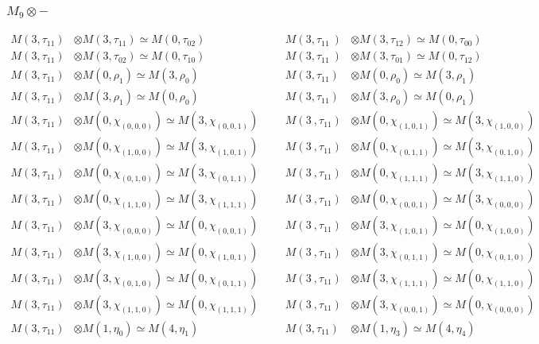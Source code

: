 \subsubsection{$M_9\otimes -$}
\begin{align*}
M(3,\tau_{11}) &\otimes M(3,\tau_{11}) \simeq M(0,\tau_{02}) &&& M(3,\tau_{11}\
) &\otimes M(3,\tau_{12}) \simeq M(0,\tau_{00})\\
M(3,\tau_{11}) &\otimes M(3,\tau_{02}) \simeq M(0,\tau_{10}) &&& M(3,\tau_{11}\
) &\otimes M(3,\tau_{01}) \simeq M(0,\tau_{12})\\
M(3,\tau_{11}) &\otimes M(0,\rho_{1}) \simeq M(3,\rho_{0}) &&& M(3,\tau_{11}) \
&\otimes M(0,\rho_{0}) \simeq M(3,\rho_{1})\\
M(3,\tau_{11}) &\otimes M(3,\rho_{1}) \simeq M(0,\rho_{0}) &&& M(3,\tau_{11}) \
&\otimes M(3,\rho_{0}) \simeq M(0,\rho_{1})\\
M(3,\tau_{11}) &\otimes M(0,\chi_{(0,0,0)}) \simeq M(3,\chi_{(0,0,1)}) &&& M(3\
,\tau_{11}) &\otimes M(0,\chi_{(1,0,1)}) \simeq M(3,\chi_{(1,0,0)})\\
M(3,\tau_{11}) &\otimes M(0,\chi_{(1,0,0)}) \simeq M(3,\chi_{(1,0,1)}) &&& M(3\
,\tau_{11}) &\otimes M(0,\chi_{(0,1,1)}) \simeq M(3,\chi_{(0,1,0)})\\
M(3,\tau_{11}) &\otimes M(0,\chi_{(0,1,0)}) \simeq M(3,\chi_{(0,1,1)}) &&& M(3\
,\tau_{11}) &\otimes M(0,\chi_{(1,1,1)}) \simeq M(3,\chi_{(1,1,0)})\\
M(3,\tau_{11}) &\otimes M(0,\chi_{(1,1,0)}) \simeq M(3,\chi_{(1,1,1)}) &&& M(3\
,\tau_{11}) &\otimes M(0,\chi_{(0,0,1)}) \simeq M(3,\chi_{(0,0,0)})\\
M(3,\tau_{11}) &\otimes M(3,\chi_{(0,0,0)}) \simeq M(0,\chi_{(0,0,1)}) &&& M(3\
,\tau_{11}) &\otimes M(3,\chi_{(1,0,1)}) \simeq M(0,\chi_{(1,0,0)})\\
M(3,\tau_{11}) &\otimes M(3,\chi_{(1,0,0)}) \simeq M(0,\chi_{(1,0,1)}) &&& M(3\
,\tau_{11}) &\otimes M(3,\chi_{(0,1,1)}) \simeq M(0,\chi_{(0,1,0)})\\
M(3,\tau_{11}) &\otimes M(3,\chi_{(0,1,0)}) \simeq M(0,\chi_{(0,1,1)}) &&& M(3\
,\tau_{11}) &\otimes M(3,\chi_{(1,1,1)}) \simeq M(0,\chi_{(1,1,0)})\\
M(3,\tau_{11}) &\otimes M(3,\chi_{(1,1,0)}) \simeq M(0,\chi_{(1,1,1)}) &&& M(3\
,\tau_{11}) &\otimes M(3,\chi_{(0,0,1)}) \simeq M(0,\chi_{(0,0,0)})\\
M(3,\tau_{11}) &\otimes M(1,\eta_{0}) \simeq M(4,\eta_{1}) &&& M(3,\tau_{11}) \
&\otimes M(1,\eta_{3}) \simeq M(4,\eta_{4})\\

\end{align*}
